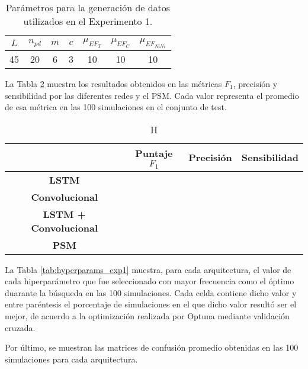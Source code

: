 \documentclass[../main.tex]{subfiles}
\begin{document}
\begin{table}[H]
    \centering
    \begin{tabular}{|c|c|c|c|c|c|c|}
        \hline
        \(L\) & \(n_{pd}\) & \(m\) & \(c\) & \(\mu_{EF_T}\) & \(\mu_{EF_C}\) & \(\mu_{EF_{NiNi}}\) \\ \hline\hline
        45 & 20 & 6 & 3 & 10 & 10 & 10 \\
        \hline
    \end{tabular}
    \caption{Parámetros para la generación de datos utilizados en el Experimento 1.}
    \label{tab:params_exp1}
\end{table}

La Tabla \ref{tab:results_exp1} muestra los resultados obtenidos en las métricas \(F_1\),
precisión y sensibilidad por las diferentes redes y el PSM. Cada valor representa el
promedio de esa métrica en las 100 simulaciones en el conjunto de test.

\begin{table}[H]
    \centering
    \renewcommand{\arraystretch}{1.2}
    \begin{tabular}{|c|c|c|c|}
        \hline
         & Puntaje \(F_1\) & Precisión & Sensibilidad \\ \hline\hline
        \textbf{LSTM} & & & \\ \hline
        \textbf{Convolucional} & & & \\ \hline
        \textbf{LSTM + Convolucional} & & & \\ \hline
        \textbf{PSM} & & & \\
        \hline
    \end{tabular}
    \caption{H}
    \label{tab:results_exp1}
\end{table}

La Tabla \ref{tab:hyperparams_exp1} muestra, para cada arquitectura, el valor de cada
hiperparámetro que fue seleccionado con mayor frecuencia como el óptimo duarante la
búsqueda en las 100 simulaciones. Cada celda contiene dicho valor y entre paréntesis el
porcentaje de simulaciones en el que dicho valor resultó ser el mejor, de acuerdo a la
optimización realizada por Optuna mediante validación cruzada.

Por último, se muestran las matrices de confusión promedio obtenidas en las 100 simulaciones
para cada arquitectura.
\end{document}
